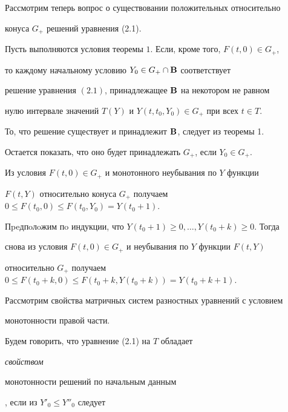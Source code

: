 Рассмотрим теперь вопрос о существовании положительных относительно


конуса $G_+$ решений уравнения (2.1).





\begin{thm}


Пусть выполняются условия теоремы $1$. Если, кроме того, $F(t,0)\in G_+$,


то каждому начальному условию $Y_0\in G_+\cap\bold B$ соответствует


решение уравнения $(2.1)$, принадлежащее $\bold B$ на некотором не равном


нулю интервале значений $T(Y)$ и $Y(t,t_0,Y_0)\in G_+$ при всех $t\in T$.


\end{thm}





\begin{pf}


То, что решение существует и принадлежит $\bold B$, следует из теоремы 1.


Остается показать, что оно будет принадлежать $G_+$, если $Y_0\in G_+$.





Из условия $F(t,0)\in G_+$ и монотонного неубывания по $Y$ функции


$F(t,Y)$ относительно конуса $G_+$ получаем $0\le F(t_0,0)\le


F(t_0,Y_0)=Y(t_0+1)$.





Пpeдпoлoжим пo индукции, что $Y(t_0+1)\ge0,\dotsc,Y(t_0+k)\ge0$. Тогда


снова из условия $F(t,0)\in G_+$ и неубывания по $Y$ функции $F(t,Y)$


относительно $G_+$ получаем $0\le F(t_0+k,0)\le F(t_0+k, Y(t_0+k))=


Y(t_0+k+1)$.


\end{pf}





Рассмотрим свойства матричных систем разностных уравнений с условием


монотонности правой части.





Будем говорить, что уравнение (2.1) на $T$ обладает {\it свойством


монотонности решений по начальным данным}, если из $Y'_0\le Y''_0$ следует


